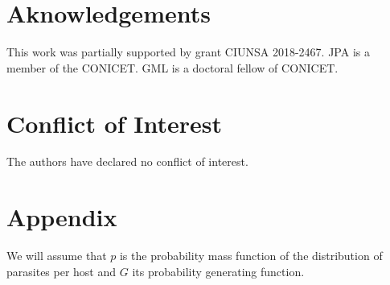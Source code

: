 \documentclass[12pt,a4paper]{article}
\theoremstyle{plain}%
\theoremstyle{definition}
\theoremstyle{remark}
\begin{document}
	
	\section*{Aknowledgements}
	
	This work was partially supported by grant CIUNSA 2018-2467. JPA is a member of the CONICET. GML is a doctoral fellow of CONICET.
	
	\section*{Conflict of Interest}
	
	The authors have declared no conflict of interest.
	
	
	\renewcommand{\bibname}{References}
	
		


	\appendix
	\section{Appendix}
	We will assume that $p$ is the probability mass function of the distribution of parasites per host and $G$ its probability generating function.
	
\end{document}
